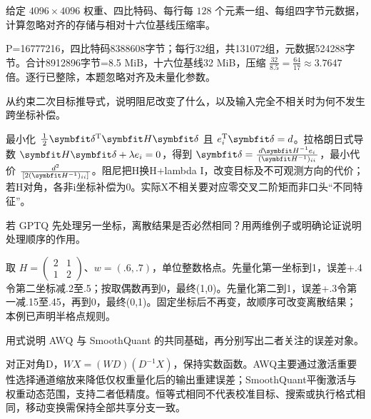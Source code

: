 \begin{exercises}
\begin{exercise} 给定 $4096\times4096$ 权重、四比特码、每行每 $128$ 个元素一组、每组四字节元数据，计算忽略对齐的存储与相对十六位基线压缩率。

\begin{solution}
P=16777216，四比特码8388608字节；每行32组，共131072组，元数据524288字节。合计8912896字节=8.5 MiB，十六位基线32 MiB，压缩 $\frac{32}{8.5}=\frac{64}{17}\approx3.7647$ 倍。逐行已整除，本题忽略对齐及未量化参数。
\end{solution}
\end{exercise}

\begin{exercise}\optional 从约束二次目标推导式，说明阻尼改变了什么，以及输入完全不相关时为何不发生跨坐标补偿。

\begin{solution}
最小化 $\frac12\vect{\delta}^{\mathrm{T}}\mat{H}\vect{\delta}$ 且 $e_i^{\mathrm{T}}\vect{\delta}=d$。拉格朗日式导数 $\mat{H}\vect{\delta}+\lambda e_i=0$，得到 $\vect{\delta}=\frac{d\mat{H}^{-1}e_i}{(\mat{H}^{-1})_{ii}}$，最小代价 $\frac{d^2}{[2(\mat{H}^{-1})_{ii}]}$。阻尼把H换H+lambda I，改变目标及不可观测方向的代价；若H对角，各非i坐标补偿为0。实际X不相关要对应零交叉二阶矩而非口头“不同特征”。
\end{solution}
\end{exercise}

\begin{exercise}\optional 若 GPTQ 先处理另一坐标，离散结果是否必然相同？用两维例子或明确论证说明处理顺序的作用。

\begin{solution}
取 $H=\begin{pmatrix}2&1\\1&2\end{pmatrix}$、$w=(.6,.7)$，单位整数格点。先量化第一坐标到1，误差+.4令第二坐标减.2至.5；按取偶数再到0，最终(1,0)。先量化第二到1，误差+.3令第一减.15至.45，再到0，最终(0,1)。固定坐标后不再变，故顺序可改变离散结果；本例已声明半格点规则。
\end{solution}
\end{exercise}

\begin{exercise} 用式说明 AWQ 与 SmoothQuant 的共同基础，再分别写出二者关注的误差对象。

\begin{solution}
对正对角D，$WX=(WD)(D^{-1}X)$，保持实数函数。AWQ主要通过激活重要性选择通道缩放来降低仅权重量化后的输出重建误差；SmoothQuant平衡激活与权重动态范围，支持二者低精度。恒等式相同不代表校准目标、搜索或执行格式相同，移动变换需保持全部共享分支一致。
\end{solution}
\end{exercise}


\end{exercises}
